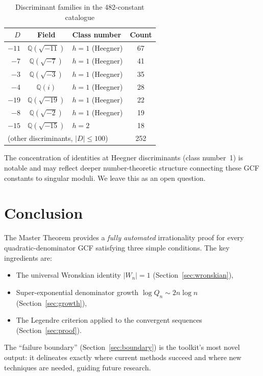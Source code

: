\documentclass[11pt,a4paper]{article}
\theoremstyle{definition}
\theoremstyle{remark}
\begin{document}
\begin{table}[h]
\centering
\caption{Discriminant families in the 482-constant catalogue}
\begin{tabular}{rclc}
\toprule
$D$ & Field & Class number & Count \\
\midrule
$-11$ & $\mathbb{Q}(\sqrt{-11})$ & $h=1$ (Heegner) & 67 \\
$-7$  & $\mathbb{Q}(\sqrt{-7})$ & $h=1$ (Heegner) & 41 \\
$-3$  & $\mathbb{Q}(\sqrt{-3})$ & $h=1$ (Heegner) & 35 \\
$-4$  & $\mathbb{Q}(i)$          & $h=1$ (Heegner) & 28 \\
$-19$ & $\mathbb{Q}(\sqrt{-19})$ & $h=1$ (Heegner) & 22 \\
$-8$  & $\mathbb{Q}(\sqrt{-2})$ & $h=1$ (Heegner) & 19 \\
$-15$ & $\mathbb{Q}(\sqrt{-15})$ & $h=2$ & 18 \\
\multicolumn{3}{l}{(other discriminants, $|D| \le 100$)} & 252 \\
\bottomrule
\end{tabular}\label{tab:disc}
\end{table}

The concentration of identities at Heegner discriminants (class number~1)
is notable and may reflect deeper number-theoretic structure connecting
these GCF constants to singular moduli.  We leave this as an open question.


\section{Conclusion}\label{sec:conclusion}

The Master Theorem provides a \emph{fully automated} irrationality proof
for every quadratic-denominator GCF satisfying three simple conditions.
The key ingredients are:
\begin{itemize}
  \item The universal Wronskian identity $|W_n| = 1$
    (Section~\ref{sec:wronskian}),
  \item Super-exponential denominator growth $\log Q_n \sim 2n\log n$
    (Section~\ref{sec:growth}),
  \item The Legendre criterion applied to the convergent sequences
    (Section~\ref{sec:proof}).
\end{itemize}
The ``failure boundary'' (Section~\ref{sec:boundary}) is the toolkit's
most novel output: it delineates exactly where current methods succeed
and where new techniques are needed, guiding future research.
\end{document}
